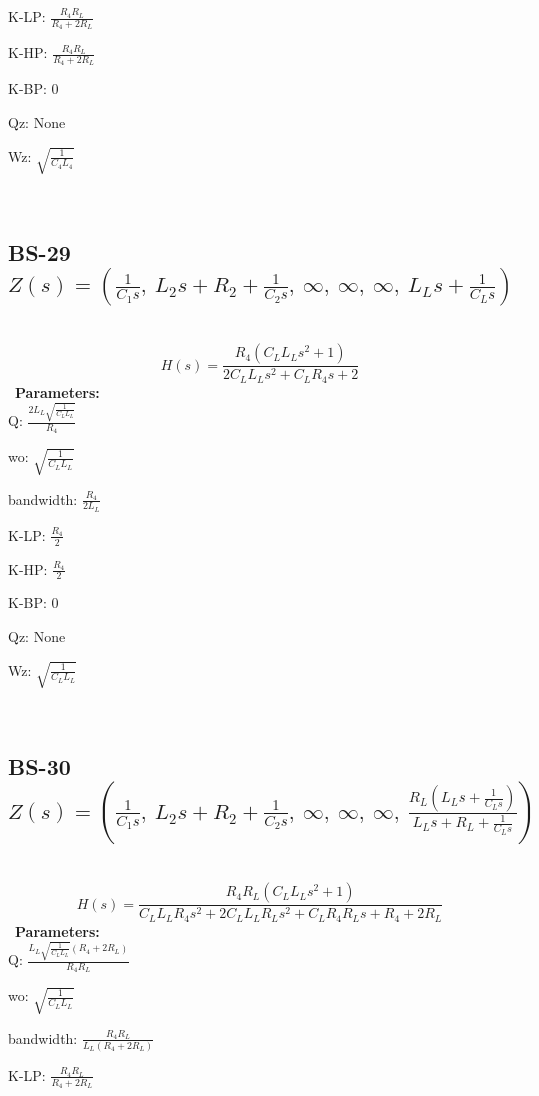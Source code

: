 \documentclass{article}
\begin{document}
K-LP: $\frac{R_{4} R_{L}}{R_{4} + 2 R_{L}}$\ 

K-HP: $\frac{R_{4} R_{L}}{R_{4} + 2 R_{L}}$\ 

K-BP: $0$\ 

Qz: $\text{None}$\ 

Wz: $\sqrt{\frac{1}{C_{4} L_{4}}}$\ 

\ 

\subsection{BS-29 $Z(s) = \left( \frac{1}{C_{1} s}, \  L_{2} s + R_{2} + \frac{1}{C_{2} s}, \  \infty, \  \infty, \  \infty, \  L_{L} s + \frac{1}{C_{L} s}\right)$ } \ 
\textbf{\[H(s) = \frac{R_{4} \left(C_{L} L_{L} s^{2} + 1\right)}{2 C_{L} L_{L} s^{2} + C_{L} R_{4} s + 2}\] } \ 
\textbf{Parameters:}\\ 

Q: $\frac{2 L_{L} \sqrt{\frac{1}{C_{L} L_{L}}}}{R_{4}}$\ 

wo: $\sqrt{\frac{1}{C_{L} L_{L}}}$\ 

bandwidth: $\frac{R_{4}}{2 L_{L}}$\ 

K-LP: $\frac{R_{4}}{2}$\ 

K-HP: $\frac{R_{4}}{2}$\ 

K-BP: $0$\ 

Qz: $\text{None}$\ 

Wz: $\sqrt{\frac{1}{C_{L} L_{L}}}$\ 

\ 

\subsection{BS-30 $Z(s) = \left( \frac{1}{C_{1} s}, \  L_{2} s + R_{2} + \frac{1}{C_{2} s}, \  \infty, \  \infty, \  \infty, \  \frac{R_{L} \left(L_{L} s + \frac{1}{C_{L} s}\right)}{L_{L} s + R_{L} + \frac{1}{C_{L} s}}\right)$ } \ 
\textbf{\[H(s) = \frac{R_{4} R_{L} \left(C_{L} L_{L} s^{2} + 1\right)}{C_{L} L_{L} R_{4} s^{2} + 2 C_{L} L_{L} R_{L} s^{2} + C_{L} R_{4} R_{L} s + R_{4} + 2 R_{L}}\] } \ 
\textbf{Parameters:}\\ 

Q: $\frac{L_{L} \sqrt{\frac{1}{C_{L} L_{L}}} \left(R_{4} + 2 R_{L}\right)}{R_{4} R_{L}}$\ 

wo: $\sqrt{\frac{1}{C_{L} L_{L}}}$\ 

bandwidth: $\frac{R_{4} R_{L}}{L_{L} \left(R_{4} + 2 R_{L}\right)}$\ 

K-LP: $\frac{R_{4} R_{L}}{R_{4} + 2 R_{L}}$\ 
\end{document}
